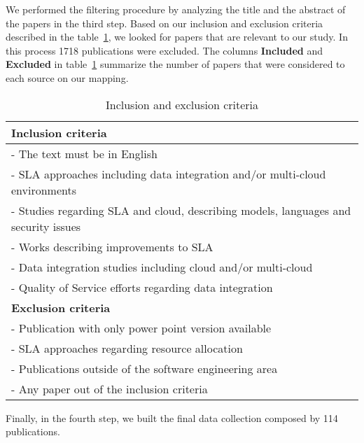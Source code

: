 
We performed the filtering procedure by analyzing the title and the abstract of the papers in the
third step. 
Based on our inclusion and exclusion criteria described in the table~\ref{table:criteria}, we looked for 
papers that are relevant to our study. 
In this process 1718 publications were excluded. 
The columns \textbf{Included} and \textbf{Excluded} in table~\ref{table:criteria} summarize the number of papers that were considered to each source on our mapping.

\begin{table}[!htb]
\begin{center}
\begin{tabular}{p{10cm}}
\bottomrule \hline
\textbf{Inclusion criteria} \\ 
\hline 
- The text must be in English \\ 
- SLA approaches including data integration and/or multi-cloud environments\\
- Studies regarding SLA and cloud, describing models, languages and security issues \\
- Works describing improvements to SLA \\
- Data integration studies including cloud and/or multi-cloud  \\
- Quality of Service efforts regarding data integration \\
\bottomrule \hline 
\textbf{Exclusion criteria} \\ 
\hline 
- Publication with only power point version available \\ 
- SLA approaches regarding resource allocation \\
- Publications outside of the software engineering area \\
- Any paper out of the inclusion criteria  \\
\bottomrule \hline
\end{tabular} 
\end{center}
\caption{Inclusion and exclusion criteria}\label{table:criteria}
\end{table}

Finally, in the fourth step, we built the final data collection composed by 114 publications.


